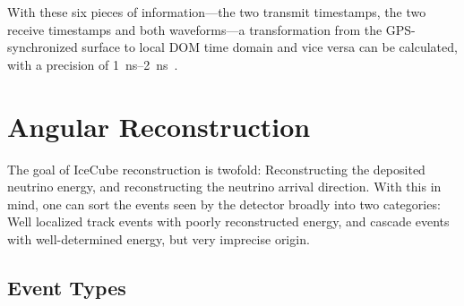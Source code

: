With these six pieces of information---the two transmit timestamps, the two receive timestamps and both waveforms---a transformation from the GPS-synchronized surface to local DOM time domain and vice versa can be calculated, with a precision of \SIrange{1}{2}{\ns}~\cite{Abbasi2009}.

\section{Angular Reconstruction}\label{reconstruction}

The goal of IceCube reconstruction is twofold: Reconstructing the deposited neutrino energy, and reconstructing the neutrino arrival direction. With this in mind, one can sort the events seen by the detector broadly into two categories: Well localized track events with poorly reconstructed energy, and cascade events with well-determined energy, but very imprecise origin.

\subsection{Event Types}\label{ic_event_types}

